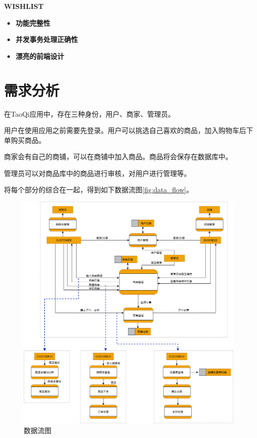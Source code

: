 \documentclass[UTF8，12pt, a4paper]{ctexart}
\begin{document}
\textbf{WISHLIST}

\begin{itemize}
    \item \textbf{功能完整性} 
    \item \textbf{并发事务处理正确性} 
    \item \textbf{漂亮的前端设计}
\end{itemize}

\section{需求分析}

在TaoQi应用中，存在三种身份，用户、商家、管理员。

用户在使用应用之前需要先登录。用户可以挑选自己喜欢的商品，加入购物车后下单购买商品。

商家会有自己的商铺，可以在商铺中加入商品。商品将会保存在数据库中。

管理员可以对商品库中的商品进行审核，对用户进行管理等。

将每个部分的综合在一起，得到如下数据流图\autoref{fig:data_flow}。

\begin{figure}[ht]
    \centering
    \includegraphics[width=\textwidth]{./DataFlow.png}
    \caption{数据流图}
    \label{fig:data_flow}
\end{figure}
\end{document}
